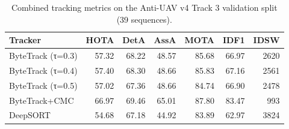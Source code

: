 \begin{table}
\caption{Combined tracking metrics on the Anti-UAV v4 Track 3 validation split (39 sequences).}
\label{tab:tracking_results}
\begin{tabular}{lrrrrrr}
\toprule
Tracker & HOTA & DetA & AssA & MOTA & IDF1 & IDSW \\
\midrule
ByteTrack (τ=0.3) & 57.32 & 68.22 & 48.57 & 85.68 & 66.97 & 2620 \\
ByteTrack (τ=0.4) & 57.40 & 68.30 & 48.66 & 85.83 & 67.16 & 2561 \\
ByteTrack (τ=0.5) & 57.02 & 67.36 & 48.66 & 84.74 & 66.90 & 2478 \\
ByteTrack+CMC & 66.97 & 69.46 & 65.01 & 87.80 & 83.47 & 993 \\
DeepSORT & 54.68 & 67.18 & 44.92 & 83.89 & 62.97 & 3824 \\
\bottomrule
\end{tabular}
\end{table}
